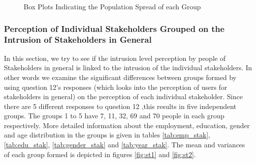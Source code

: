 \begin{figure}[htp]
\hspace{1em}
\caption{Box Plots Indicating the Population Spread of each Group}
\label{fig:st3}
\end{figure}


\subsubsection{Perception of Individual Stakeholders Grouped on the Intrusion of Stakeholders in General}

In this section, we try to see if the intrusion level perception by people of Stakeholders in general is linked to the intrusion of the individual stakeholders. In other words we examine the significant differences between groups formed by using question 12's responses (which looks into the perception of users for stakeholders in general) on the perception of
each individual stakeholder. Since there are 5 different responses to question 12 ,this results in five independent groups. The groups 1 to 5 have 7, 11, 32, 69 and 70 people in each group respectively. More detailed information about the employment, education, gender and age distribution in the groups is given in tables \ref{tab:emp_stak}, \ref{tab:edu_stak}, \ref{tab:gender_stak} and \ref{tab:year_stak}. The mean and variances of each group formed is depicted in figures \ref{fig:st1} and \ref{fig:st2}.

